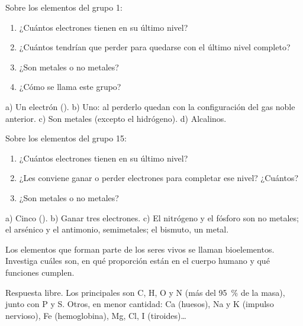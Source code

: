 \begin{exercise}
    Sobre los elementos del grupo 1:
    \begin{enumerate}[label=\alph*)]
        \item ¿Cuántos electrones tienen en su último nivel?
        \item ¿Cuántos tendrían que perder para quedarse con el último nivel completo?
        \item ¿Son metales o no metales?
        \item ¿Cómo se llama este grupo?
    \end{enumerate}
    \begin{solu}
        a) Un electrón (). b) Uno: al perderlo quedan con la configuración del gas noble anterior. c) Son metales (excepto el hidrógeno). d) Alcalinos.
    \end{solu}
\end{exercise}

\begin{exercise}
    Sobre los elementos del grupo 15:
    \begin{enumerate}[label=\alph*)]
        \item ¿Cuántos electrones tienen en su último nivel?
        \item ¿Les conviene ganar o perder electrones para completar ese nivel? ¿Cuántos?
        \item ¿Son metales o no metales?
    \end{enumerate}
    \begin{solu}
        a) Cinco (). b) Ganar tres electrones. c) El nitrógeno y el fósforo son no metales; el arsénico y el antimonio, semimetales; el bismuto, un metal.
    \end{solu}
\end{exercise}

\begin{exercise}
    Los elementos que forman parte de los seres vivos se llaman bioelementos. Investiga cuáles son, en qué proporción están en el cuerpo humano y qué funciones cumplen.
    \begin{solu}
        Respuesta libre. Los principales son C, H, O y N (más del \qty{95}{\percent} de la masa), junto con P y S. Otros, en menor cantidad: Ca (huesos), Na y K (impulso nervioso), Fe (hemoglobina), Mg, Cl, I (tiroides)\ldots
    \end{solu}
\end{exercise}

